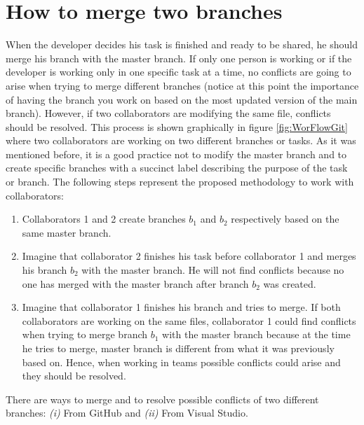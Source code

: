 \section{How to merge two branches}
When the developer decides his task is finished and ready to be shared, 
he should merge his branch with the master branch. 
If only one person is  working  or 
if the developer is working only in one specific task at a time, 
no conflicts are going to arise when trying to merge different branches  
(notice at this point the importance of having the branch you work on
based on the most updated version of the main branch).
However, if two collaborators are modifying the same file, conflicts should be resolved. 
This process is shown graphically in figure \ref{fig:WorFlowGit} where two collaborators 
are working on two different branches or tasks.  
As it was mentioned before, it is a good practice not to modify the master branch 
and to create specific branches with a succinct label describing the purpose of the task or 
branch. The following steps represent the proposed methodology to work with collaborators:   
\begin{enumerate} 
\setlength\itemsep{0.0cm}
\item Collaborators 1 and 2 create branches  $b_1$ and  $b_2$ 
respectively based on the same master branch. 
\item Imagine that collaborator 2 
finishes his task before collaborator 1 and merges his branch $b_2 $  with the master 
branch. He will not find conflicts because no one has merged with the master branch after 
 branch $b_2$ was created. 
\item Imagine that collaborator 1 finishes his branch and tries to merge. 
If both collaborators are working on the same files, 
collaborator 1 could find conflicts when trying to merge branch $b_1$ with the master branch 
because at the time he tries to merge,  master branch is different from what 
it was previously based on. 
Hence, when working in teams possible conflicts could arise and they should be resolved. 
\end{enumerate} 
 
There are ways to merge and  to resolve possible conflicts of two different branches: {\it (i) } From GitHub and    
 {\it (ii) } From Visual Studio.  

